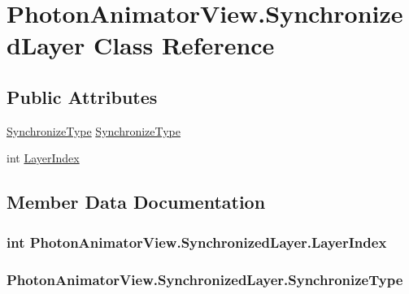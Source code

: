 \hypertarget{class_photon_animator_view_1_1_synchronized_layer}{}\section{Photon\+Animator\+View.\+Synchronized\+Layer Class Reference}
\label{class_photon_animator_view_1_1_synchronized_layer}
\subsection*{Public Attributes}
\begin{DoxyCompactItemize}
\item 
\hyperlink{class_photon_animator_view_ae3ad07de936a811cbb923adffe1f167f}{Synchronize\+Type} \hyperlink{class_photon_animator_view_1_1_synchronized_layer_a68d11cfd6780c4237bda70ee5f92a72c}{Synchronize\+Type}
\item 
int \hyperlink{class_photon_animator_view_1_1_synchronized_layer_ad1d491c302d7fbdf8f423c66561602b4}{Layer\+Index}
\end{DoxyCompactItemize}


\subsection{Member Data Documentation}
\subsubsection[{\texorpdfstring{Layer\+Index}{LayerIndex}}]{\setlength{\rightskip}{0pt plus 5cm}int Photon\+Animator\+View.\+Synchronized\+Layer.\+Layer\+Index}\hypertarget{class_photon_animator_view_1_1_synchronized_layer_ad1d491c302d7fbdf8f423c66561602b4}{}\label{class_photon_animator_view_1_1_synchronized_layer_ad1d491c302d7fbdf8f423c66561602b4}
\subsubsection[{\texorpdfstring{Synchronize\+Type}{SynchronizeType}}]{ Photon\+Animator\+View.\+Synchronized\+Layer.\+Synchronize\+Type}\hypertarget{class_photon_animator_view_1_1_synchronized_layer_a68d11cfd6780c4237bda70ee5f92a72c}{}\label{class_photon_animator_view_1_1_synchronized_layer_a68d11cfd6780c4237bda70ee5f92a72c}


